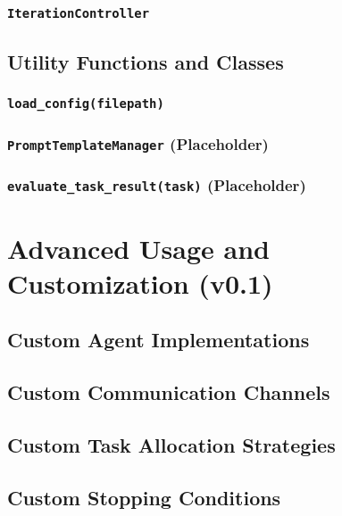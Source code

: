 \documentclass{amsbook}
\theoremstyle{definition}
\theoremstyle{remark}
\numberwithin{equation}{chapter} %
\begin{document}
        \subsection{\texttt{IterationController}}
    \section{Utility Functions and Classes}
        \subsection{\texttt{load\_config(filepath)}}
        \subsection{\texttt{PromptTemplateManager} (Placeholder)}
        \subsection{\texttt{evaluate\_task\_result(task)} (Placeholder)}

\chapter{Advanced Usage and Customization (v0.1)}
    \section{Custom Agent Implementations}
    \section{Custom Communication Channels}
    \section{Custom Task Allocation Strategies}
    \section{Custom Stopping Conditions}
\end{document}
